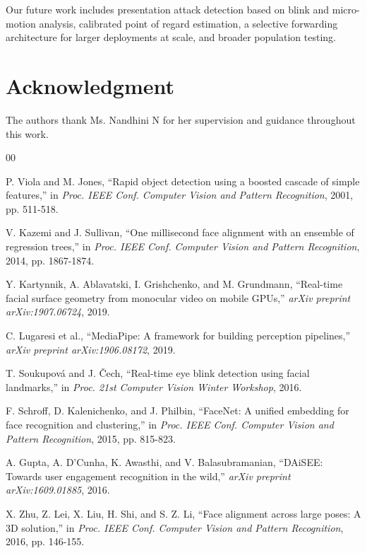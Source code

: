 \documentclass[conference]{IEEEtran}
\begin{document}
Our future work includes presentation attack detection based on blink
and micro-motion analysis, calibrated point of regard estimation,
a selective forwarding architecture for larger deployments at scale,
and broader population testing.

\section*{Acknowledgment}

The authors thank Ms. Nandhini N for her supervision and guidance
throughout this work.

\begin{thebibliography}{00}


P. Viola and M. Jones, ``Rapid object detection using a boosted cascade of
simple features,'' in \emph{Proc. IEEE Conf. Computer Vision and Pattern
Recognition}, 2001, pp. 511-518.

V. Kazemi and J. Sullivan, ``One millisecond face alignment with an
ensemble of regression trees,'' in \emph{Proc. IEEE Conf. Computer Vision
and Pattern Recognition}, 2014, pp. 1867-1874.

Y. Kartynnik, A. Ablavatski, I. Grishchenko, and M. Grundmann,
``Real-time facial surface geometry from monocular video on mobile
GPUs,'' \emph{arXiv preprint arXiv:1907.06724}, 2019.

C. Lugaresi et al., ``MediaPipe: A framework for building
perception pipelines,'' \emph{arXiv preprint arXiv:1906.08172}, 2019.

T. Soukupov\'{a} and J. \v{C}ech, ``Real-time eye blink detection using
facial landmarks,'' in \emph{Proc. 21st Computer Vision Winter Workshop},
2016.

F. Schroff, D. Kalenichenko, and J. Philbin, ``FaceNet: A unified
embedding for face recognition and clustering,'' in \emph{Proc. IEEE Conf.
Computer Vision and Pattern Recognition}, 2015, pp. 815-823.

A. Gupta, A. D'Cunha, K. Awasthi, and V. Balasubramanian, ``DAiSEE:
Towards user engagement recognition in the wild,'' \emph{arXiv preprint
arXiv:1609.01885}, 2016.

X. Zhu, Z. Lei, X. Liu, H. Shi, and S. Z. Li, ``Face alignment across
large poses: A 3D solution,'' in \emph{Proc. IEEE Conf. Computer Vision
and Pattern Recognition}, 2016, pp. 146-155.

\end{thebibliography}
\end{document}
